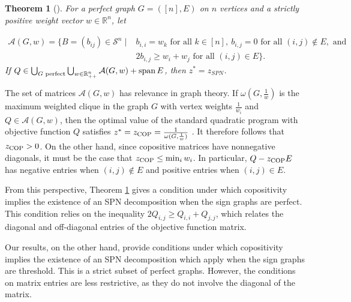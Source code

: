 \documentclass{amsart}
\def\spann{\mathop{\rm span}\nolimits}
\newcommand{\bbR}{\mathbb{R}}
\newcommand{\cA}{\mathcal{A}}
\newcommand{\cS}{\mathcal{S}}
\newtheorem{theorem}{Theorem}[section]
\theoremstyle{definition}
\begin{document}
\begin{theorem}[{\cite[Proposition 6]{gokmen2022standard}}]\label{thm:PerfectGraph}
For a perfect graph $G = ([n],E)$ on $n$ vertices and a strictly positive weight vector $w \in \bbR^n$, let 

\[\begin{split}
\cA(G,w) = \{B = (b_{ij})\in \cS^n \; \vert \;& b_{i,i} = w_k \text{ for all } k \in [n], \ b_{i,j} = 0 \text{ for all } (i,j) \not \in E, \text{ and } \\ & 2b_{i,j} \geq w_i + w_j \text{ for all } (i,j) \in E\}.
\end{split}\]
%
If $Q \in \bigcup_{G \text{ perfect}}\bigcup_{w \in \bbR^n_{++}} \cA(G,w) + \spann E$, then $z^* = z_{SPN}$.
\end{theorem}

The set of matrices $\cA(G,w)$ has relevance in graph theory. If $\omega(G,\frac{1}{w})$ is the maximum weighted clique in the graph $G$ with vertex weights $\frac{1}{w_i}$ and $Q \in \cA(G,w)$, then the optimal value of the standard quadratic program with objective function $Q$ satisfies $z^* = z_{\textup{COP}} = \frac{1}{\omega(G,\frac{1}{w})}$ \cite{gibbons1997continuous}. It therefore follows that $z_{\textup{COP}} >0$. On the other hand, since copositive matrices have nonnegative diagonals, it must be the case that $z_{\textup{COP}} \leq \min_{i}w_i$. In particular, $Q-z_{\textup{COP}}E$ has negative entries when $(i,j) \not \in E$ and positive entries when $(i,j) \in E$.

From this perspective, Theorem \ref{thm:PerfectGraph} gives a condition under which copositivity implies the existence of an SPN decomposition when the sign graphs are perfect. This condition relies on the inequality $2Q_{i,j} \geq Q_{i,i} + Q_{j,j}$, which relates the diagonal and off-diagonal entries of the objective function matrix. 

Our results, on the other hand, provide conditions under which copositivity implies the existence of an SPN decomposition which apply when the sign graphs are threshold. This is a strict subset of perfect graphs. However, the conditions on matrix entries are less restrictive, as they do not involve the diagonal of the matrix. 


\printbibliography
\end{document}
